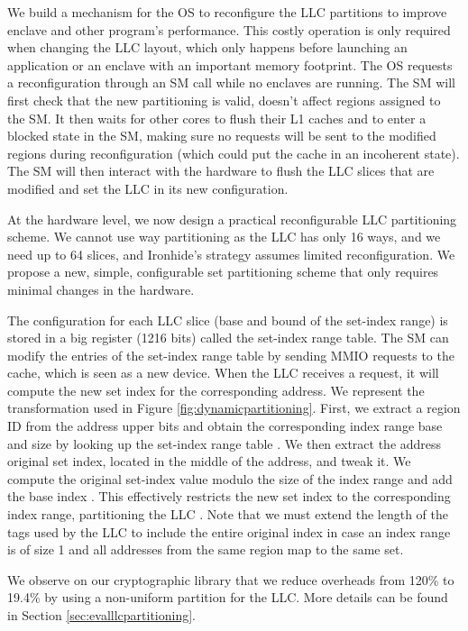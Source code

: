 We build a mechanism for the OS to reconfigure the LLC partitions to improve enclave and other program's performance.
This costly operation is only required when changing the LLC layout, which only happens before launching an application or an enclave with an important memory footprint.
The OS requests a reconfiguration through an SM call while no enclaves are running.
The SM will first check that the new partitioning is valid, doesn't affect regions assigned to the SM.
It then waits for other cores to flush their L1 caches and to enter a blocked state in the SM, making sure no requests will be sent to the modified regions during reconfiguration (which could put the cache in an incoherent state).
The SM will then interact with the hardware to flush the LLC slices that are modified and set the LLC in its new configuration.

At the hardware level, we now design a practical reconfigurable LLC partitioning scheme.
We cannot use way partitioning \cite{kiriansky2018dawg} as the LLC has only 16 ways, and we need up to 64 slices, and Ironhide's \cite{ironhide} strategy assumes limited reconfiguration.
We propose a new, simple, configurable set partitioning scheme that only requires minimal changes in the hardware.

The configuration for each LLC slice (base and bound of the set-index range) is stored in a big register (1216 bits) called the set-index range table.
The SM can modify the entries of the set-index range table by sending MMIO requests to the cache, which is seen as a new device.
When the LLC receives a request, it will compute the new set index for the corresponding address.
We represent the transformation used in Figure \ref{fig:dynamicpartitioning}.
First, we extract a region ID from the address upper bits and obtain the corresponding index range base and size by looking up the set-index range table .
We then extract the address original set index, located in the middle of the address, and tweak it.
We compute the original set-index value modulo the size of the index range  and add the base index .
This effectively restricts the new set index to the corresponding index range, partitioning the LLC .
Note that we must extend the length of the tags used by the LLC to include the entire original index in case an index range is of size 1 and all addresses from the same region map to the same set.
 
We observe on our cryptographic library that we reduce overheads from 120\% to 19.4\% by using a non-uniform partition for the LLC. More details can be found in Section \ref{sec:evalllcpartitioning}.

